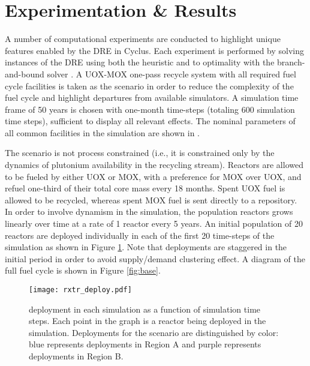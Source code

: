 \section{Experimentation \& Results}\label{sec:results}


A number of computational experiments are conducted to highlight unique features
enabled by the DRE in Cyclus. Each experiment is performed by solving instances
of the DRE using both the \greedy heuristic and to optimality with the
branch-and-bound solver \cbc. A UOX-MOX one-pass recycle system with all
required fuel cycle facilities is taken as the \basecase scenario in order to
reduce the complexity of the fuel cycle and highlight departures from available
simulators. A simulation time frame of 50 years is chosen with one-month
time-steps (totaling 600 simulation time steps), sufficient to display all
relevant effects. The nominal parameters of all common facilities in the
simulation are shown in . 

The \basecase scenario is not process constrained (i.e., it is constrained only
by the dynamics of plutonium availability in the recycling stream). Reactors are
allowed to be fueled by either UOX or MOX, with a preference for MOX over UOX,
and refuel one-third of their total core mass every 18 months. Spent UOX fuel is
allowed to be recycled, whereas spent MOX fuel is sent directly to a
repository. In order to involve dynamism in the simulation, the population
reactors grows linearly over time at a rate of 1 reactor every 5 years. An
initial population of 20 reactors are deployed individually in each of the first
20 time-steps of the simulation as shown in Figure \ref{fig:deploy}. Note that
deployments are staggered in the initial period in order to avoid supply/demand
clustering effect. A diagram of the full \basecase fuel cycle is shown in Figure
\ref{fig:base}.

\begin{figure}
  \begin{center}
    \texttt{[image: rxtr\_deploy.pdf]}
    \caption[]{
      \label{fig:deploy}
      \reactor deployment in each simulation as a function of simulation time
      steps. Each point in the graph is a reactor being deployed in the
      simulation. Deployments for the \tariff scenario are distinguished by
      color: blue represents deployments in Region A and purple represents
      deployments in Region B.}
  \end{center}
\end{figure}

